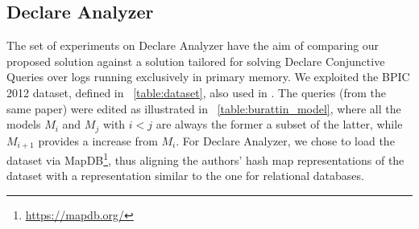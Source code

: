 \subsection{Declare Analyzer}\label{ssec:declan}
The set of experiments on Declare Analyzer have the aim of comparing our proposed solution against a solution tailored for solving Declare Conjunctive Queries over logs running exclusively in primary memory. %
We exploited the {BPIC 2012} dataset, defined in \tablename~\ref{table:dataset}, also used in \cite{BurattinMS16}.   The queries (from the same paper)  were edited as illustrated in \tablename~\ref{table:burattin_model}, where all the models $M_i$ and $M_j$ with $i<j$ are always the former a subset of the latter, while $M_{i+1}$ provides a   increase from $M_i$. For Declare Analyzer, we chose to load the dataset via MapDB\footnote{\url{https://mapdb.org/}}, thus aligning the authors' hash map representations of the dataset with a representation similar to the one for relational databases. 


